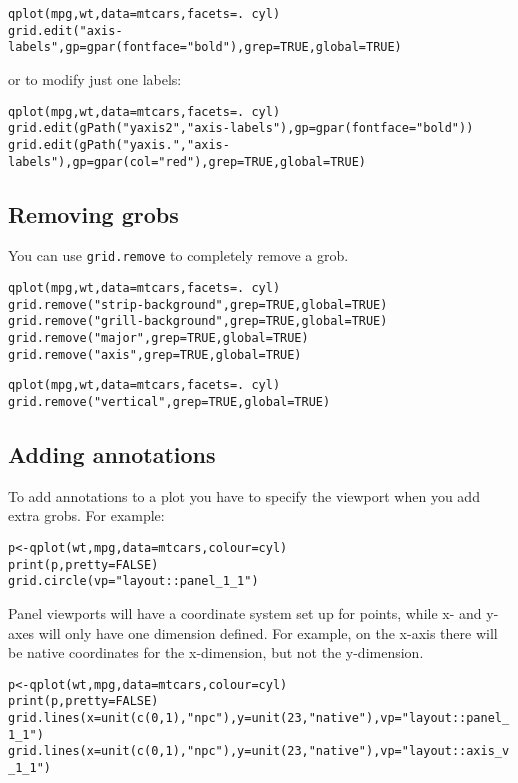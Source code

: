 \begin{alltt}
qplot(mpg, wt, data=mtcars, facets = . ~ cyl)
grid.edit("axis-labels", gp=gpar(fontface="bold"), grep=TRUE, global=TRUE)
\end{alltt}

or to modify just one labels:

\begin{alltt}
qplot(mpg, wt, data=mtcars, facets = . ~ cyl)
grid.edit(gPath("yaxis2", "axis-labels"), gp=gpar(fontface="bold"))
grid.edit(gPath("yaxis.", "axis-labels"), gp=gpar(col="red"), grep=TRUE, global=TRUE)
\end{alltt}

\subsection{Removing grobs}\label{ssub:removing_grobs}

You can use {\tt grid.remove} to completely remove a grob.

\begin{alltt}
qplot(mpg, wt, data=mtcars, facets = . ~ cyl)
grid.remove("strip-background", grep=TRUE, global=TRUE)
grid.remove("grill-background", grep=TRUE, global=TRUE)
grid.remove("major", grep=TRUE, global=TRUE)
grid.remove("axis", grep=TRUE, global=TRUE)

qplot(mpg, wt, data=mtcars, facets = . ~ cyl)
grid.remove("vertical", grep=TRUE, global=TRUE)
\end{alltt}

\subsection{Adding annotations}\label{sec:adding_annotation}

To add annotations to a plot you have to specify the viewport when you add extra grobs.  For example:

\begin{alltt}
p <- qplot(wt, mpg, data=mtcars, colour=cyl)
print(p, pretty=FALSE)
grid.circle(vp="layout::panel_1_1")
\end{alltt}

Panel viewports will have a coordinate system set up for points, while x- and y- axes will only have one dimension defined.  For example, on the x-axis there will be native coordinates for the x-dimension, but not the y-dimension.

\begin{alltt}
p <- qplot(wt, mpg, data=mtcars, colour=cyl)
print(p, pretty=FALSE)
grid.lines(x=unit(c(0,1), "npc"), y=unit(23, "native"), vp="layout::panel_1_1")
grid.lines(x=unit(c(0,1), "npc"), y=unit(23, "native"), vp="layout::axis_v_1_1")
\end{alltt}

